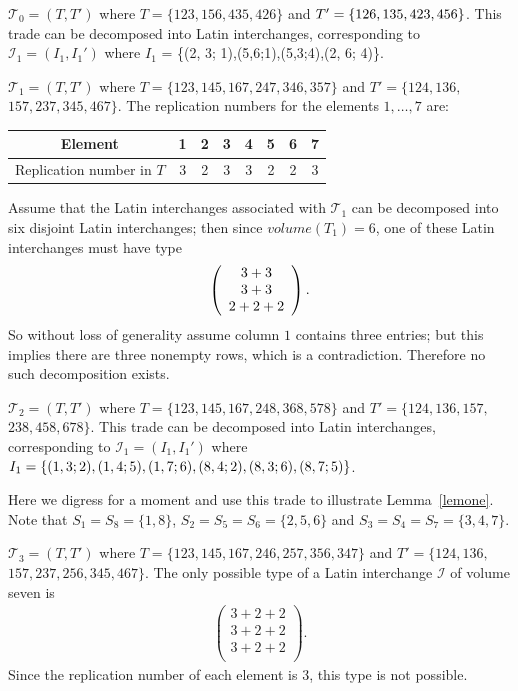 \documentclass[12pt]{report}
\begin{document}
 ${\mathcal T}_0=(T,T')$ 
where $T=\{1 2 3,1 5 6,4 3 5,4 2 6\}$ and
$T'=\{1 2 6,1 3 5,\break 4 2 3,4 5 6\}$.
This trade can be decomposed into Latin interchanges, corresponding to
$\mathcal{I}_1 = (I_1,I_1')$ where 
$I_1$ = \{(2, 3; 1),(5,6;1),(5,3;4),(2, 6; 4)\}.
\vspace{.5cm}

 ${\mathcal T}_1=(T,T')$ where 
$T=\{1 2 3,1 4 5,1 6 7,2 4 7,3 4 6,3 5 7\}$ and 
$T'=\{1 2 4,1 3 6,$ $ 1 5 7,2 3 7,3 4 5,4 6 7\}$.
The replication numbers for the elements $1,\dots, 7$ are:
\begin{center}
\begin{tabular}{c|c|c|c|c|c|c|c}
             Element & 1 & 2 & 3 & 4 & 5 & 6 & 7 \\
			  \hline
 Replication number in $T$ & 3 & 2 & 3 & 3 & 2 & 2 & 3 
\end{tabular}
\end{center}

Assume that the Latin interchanges associated 
with ${\mathcal T}_1$ can be decomposed into six disjoint Latin 
interchanges; then since  $volume(T_1)=6$, one of these Latin 
interchanges must have type
\begin{eqnarray*}
\left(
\begin{array}{c}
    3+3\cr
3+3\\
2+2+2
\end{array}
\right).
\end{eqnarray*}
So without loss of generality assume column $1$ contains three entries; 
but this implies there are three nonempty rows, which is a 
contradiction. Therefore no such decomposition exists.
\vspace{.5cm}

 ${\mathcal T}_2=(T,T')$ where 
$T=\{1 2 3,1 4 5,1 6 7,2 4 8,3 6 8,5 7 8 \}$
and $T'= \{1 2 4,1 3 6,1 5 7,$ $2 3 8,4 5 8,6 7 8 \}$.
This trade can be decomposed into Latin interchanges, corresponding to 
$\mathcal{I}_1 = (I_1,I_1')$ where 
$I_1= \{(1, 3; 2),(1, 4; 5),
(1, 7; 6),(8,4;2),(8, 3; 6),\break (8, 7; 5)\}$.

Here we digress for a moment and use this trade  to illustrate  Lemma~\ref{lemone}.
Note that $S_1=S_8=\{1,8\}$, $S_2=S_5=S_6=\{2,5,6\}$ and
$S_3=S_4=S_7=\{3,4,7\}.$
\vspace{.5cm}

 ${\mathcal T}_3=(T,T')$ where 
$T=\{1 2 3,1 4 5,1 6 7,2 4 6,2 5 7,3 5 6,3 4 7\}$ and 
$T'=\{1 2 4,1 3 6,$ $1 5 7,2 3 7,2 5 6,3 4 5,4 6 7\}$. 
The only possible type of a Latin interchange $\mathcal I$ of volume
seven is
\begin{eqnarray*}
\left(
\begin{array}{c}
3+2+2 \\
3+2+2 \\
3+2+2 \\
\end{array}
\right).
\end{eqnarray*}
Since the replication number of each element is $3$, this type 
is not possible.
\vspace{.5cm}
\end{document}
